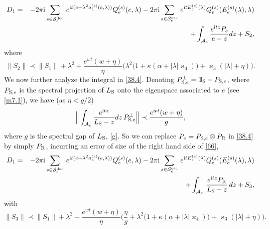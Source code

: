 \documentclass[letterpaper,onecolumn,11pt,accepted=2021-12-09]{quantumarticle}
\numberwithin{equation}{section}
\newcommand{\aes}{a_e^{(s)}}
\newcommand{\Qes}{Q_e^{(s)}}
\newcommand{\Ees}{E_e^{(s)}(\lambda)}
\renewcommand{\r}{{\rm R}}
\newcommand{\s}{{\rm S}}
\renewcommand{\i}{{\rm i}}
\newcommand{\bbbone}{\mathchoice {\rm 1\mskip-4mu l} {\rm 1\mskip-4mu l}
	{\rm 1\mskip-4.5mu l} {\rm 1\mskip-5mu l}}
\newcommand{\R}{{\rm R}}
\begin{document}
\begin{eqnarray}
D_1 &=&-2\pi\i \sum_{s\in{\mathcal S}_e^{\rm dec}}  \, e^{\i t(e+\lambda^2\aes(e,\lambda))} \Qes(e,\lambda) - 2\pi\i\sum_{s\in{\mathcal S}_e^{\rm osc}}  \, e^{\i t \Ees}\Qes(\Ees,\lambda)  \nonumber\\
&&+\int_{{\mathcal A}_e} \frac{e^{\i t z}P_e}{e-z}dz +S_2,	
\label{38.4}
\end{eqnarray}
where
\begin{equation}
\| S_2\| \prec  \|S_1\|+ \lambda^2+ \frac{e^{wt}(w+\eta)}{\eta}\Big( \lambda^2\big(1+\kappa(\alpha+|\lambda|\varkappa_4)\big)+\varkappa_3( |\lambda|+\eta)  \Big).
\label{m99}
\end{equation}
We now further analyze the integral in \eqref{38.4}. 
Denoting $P^\perp_{\s,e} =\bbbone_\s-P_{\s,e}$, where $P_{\s,e}$ is the spectral projection of $L_\s$ onto the eigenspace associated to $e$ (see \eqref{m7.1}), we have (as $\eta<g/2$)
\begin{equation}
\label{66}
\Big \|\int_{{\mathcal A}_e} \frac{e^{\i tz}}{L_\s-z}dz \, P^\perp_{\s,e}\Big\| \prec  \frac{e^{wt}(w+\eta)}{g},
\end{equation}
where $g$ is the spectral gap of $L_\s$, \eqref{g}.  So we can replace $P_e=P_{\s,e}\otimes P_\R$ in \eqref{38.4} by simply $P_\r$, incurring an error of size of the right hand side of \eqref{66},
\begin{eqnarray}
D_1 &=&-2\pi\i \sum_{s\in{\mathcal S}_e^{\rm dec}}  \, e^{\i t(e+\lambda^2\aes(e,\lambda))} \Qes(e,\lambda) - 2\pi\i\sum_{s\in{\mathcal S}_e^{\rm osc}}  \, e^{\i t \Ees}\Qes(\Ees,\lambda) \nonumber\\
&&  +\int_{{\mathcal A}_e}  \,  \frac{e^{\i t z} P_\r}{L_\s- z}  \, dz  +S_3,	
\label{43}
\end{eqnarray}
with 
\begin{equation}
	\| S_3\| \prec \|S_1\| + \lambda^2+ \frac{e^{wt}(w+\eta)}{\eta}\Big(\frac{\eta}{g}+ \lambda^2\big(1+\kappa(\alpha+|\lambda|\varkappa_4)\big)+\varkappa_3( |\lambda|+\eta)  \Big).
	\label{m99.1}
\end{equation}




\medskip
\end{document}
